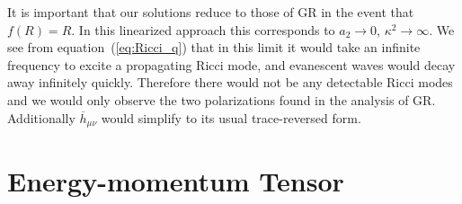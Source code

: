 \documentclass[a4paper, 11pt, titlepage, twoside]{report}
\newcommand{\eqnref}[1]{equation~(\ref{eq:#1})}
\begin{document}
It is important that our solutions reduce to those of GR in the event that $f(R) = R$. In this linearized approach this corresponds to $a_2 \rightarrow 0$, $\kappa^2 \rightarrow \infty$. We see from \eqnref{Ricci_q} that in this limit it would take an infinite frequency to excite a propagating Ricci mode, and evanescent waves would decay away infinitely quickly. Therefore there would not be any detectable Ricci modes and we would only observe the two polarizations found in the analysis of GR. Additionally $\overline{h}_{\mu\nu}$ would simplify to its usual trace-reversed form.

\section{Energy-momentum Tensor}\label{sec:EM_tensor}
\end{document}
